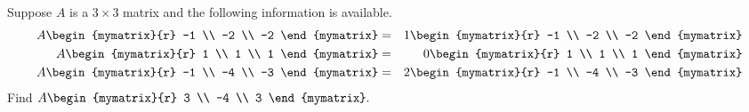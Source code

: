 \begin{enumialphparenastyle}
\begin{ex} Suppose $A$ is a $3\times 3$ matrix and the following information is
available.
\begin{eqnarray*}
A\begin{mymatrix}{r}
-1 \\
-2 \\
-2
\end{mymatrix} &=&1\begin{mymatrix}{r}
-1 \\
-2 \\
-2
\end{mymatrix} \\
A\begin{mymatrix}{r}
1 \\
1 \\
1
\end{mymatrix} &=& 0\begin{mymatrix}{r}
1 \\
1 \\
1
\end{mymatrix} \\
A\begin{mymatrix}{r}
-1 \\
-4 \\
-3
\end{mymatrix} &=&2\begin{mymatrix}{r}
-1 \\
-4 \\
-3
\end{mymatrix}
\end{eqnarray*}
Find $A\begin{mymatrix}{r}
3 \\
-4 \\
3
\end{mymatrix}. $
\end{ex}


\end{enumialphparenastyle}
